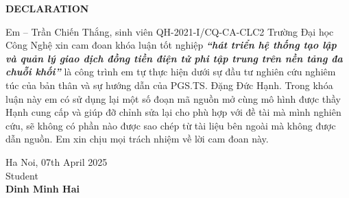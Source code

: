 \setlength{\parindent}{1cm}

\begin{center}
  \textbf{\large{DECLARATION}	}
\end{center}

Em – Trần Chiến Thắng, sinh viên QH-2021-I/CQ-CA-CLC2 Trường Đại học
Công Nghệ xin cam đoan khóa luận tốt nghiệp \textbf{\textit{“hát triển hệ thống
    tạo lập và quản lý giao dịch đồng tiền điện tử phi tập trung trên nền tảng đa
    chuỗi khối”}} là công trình em tự thực hiện dưới sự đầu tư nghiên cứu nghiêm
túc của bản thân và sự hướng dẫn của PGS.TS. Đặng Đức Hạnh. Trong khóa luận này
em có sử dụng lại một số đoạn mã nguồn mở cùng mô hình được thầy Hạnh cung cấp
và giúp đỡ chỉnh sửa lại cho phù hợp với đề tài mà mình nghiên cứu, sẽ không có
phần nào được sao chép từ tài liệu bên ngoài mà không được dẫn nguồn. Em xin
chịu mọi trách nhiệm về lời cam đoan này.




\vspace{1cm}
\begin{flushright}
  \begin{minipage}{8cm}
    \centering
    Ha Noi, 07th April 2025\\[0.2cm]
    Student\\[2.5cm]

    \textbf{Dinh Minh Hai}
  \end{minipage}
\end{flushright}